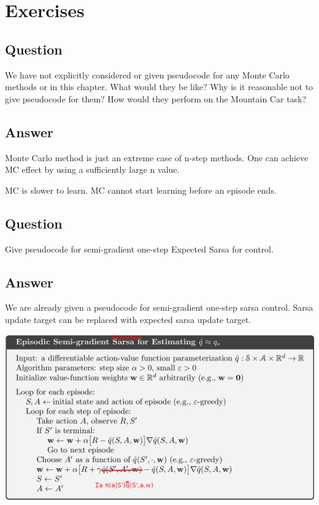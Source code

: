 \documentclass[11pt]{article}
\begin{document}
    \maketitle
    \setcounter{section}{9}


    \section{Exercises}

    \subsection{Question}

    We have not explicitly considered or given pseudocode for any Monte Carlo methods or in this chapter.
    What would they be like?
    Why is it reasonable not to give pseudocode for them?
    How would they perform on the Mountain Car task?

    \subsection*{Answer}

    Monte Carlo method is just an extreme case of n-step methods.
    One can achieve MC effect by using a sufficiently large n value.

    MC is slower to learn.
    MC cannot start learning before an episode ends.

    \subsection{Question}

    Give pseudocode for semi-gradient one-step Expected Sarsa for control.

    \subsection*{Answer}

    We are already given a pseudocode for semi-gradient one-step sarsa control.
    Sarsa update target can be replaced with expected sarsa update target.

    \includegraphics[scale=0.7]{exercise_10_2}
\end{document}

